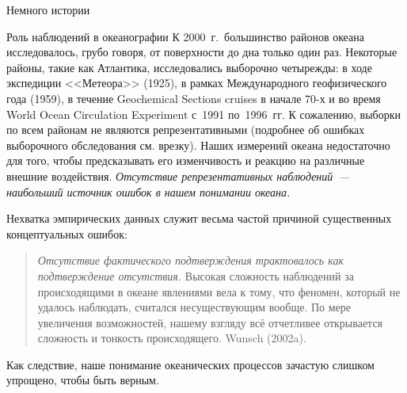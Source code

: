 \begin{chapter}{Немного истории}
\begin{section}{Роль наблюдений в океанографии}
К 2000~г.\ большинство районов океана исследовалось, грубо говоря, от поверхности до
дна только один раз. Некоторые районы, такие как Атлантика,
исследовались выборочно четырежды: в ходе экспедиции <<Метеора>> (1925), 
в рамках Международного геофизического года (1959), 
в течение Geochemical Sections cruises в начале 70-х
и во время World Ocean Circulation Experiment с~1991 по~1996~гг. 
К сожалению, выборки по всем районам не являются репрезентативными 
(подробнее об ошибках выборочного обследования см. врезку).
Наших измерений океана недостаточно для того, чтобы предсказывать его 
изменчивость и реакцию на различные внешние воздействия.
\emph{Отсутствие репрезентативных наблюдений~--- наибольший источник
ошибок в нашем понимании океана.}
%

Нехватка эмпирических данных служит весьма частой причиной существенных
концептуальных ошибок: 
\begin{quote}
\emph{Отсутствие фактического подтверждения трактовалось как подтверждение 
отсутствия.} Высокая сложность наблюдений за происходящими в океане явлениями
вела к тому, что феномен, который не удалось наблюдать, считался несуществующим
вообще. По мере увеличения возможностей, нашему взгляду всё отчетливее 
открывается сложность и тонкость происходящего. Wunsch (2002a).
\end{quote}
Как следствие, наше понимание океанических процессов зачастую слишком упрощено,
чтобы быть верным.
%


\end{section}
\end{chapter}

